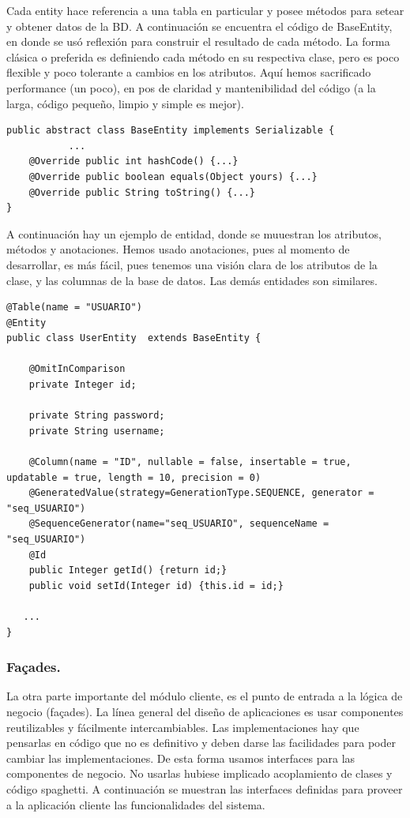 \documentclass[letter]{article}
\begin{document}
Cada entity hace referencia a una tabla en particular y posee métodos para setear y obtener datos de la BD. A continuación se encuentra el código de BaseEntity, en donde se usó reflexión para construir el resultado de cada método. La forma clásica o preferida es definiendo cada método en su respectiva clase, pero es poco flexible y poco tolerante a cambios en los atributos. Aquí hemos sacrificado performance (un poco), en pos de claridad y mantenibilidad del código (a la larga, código pequeño, limpio y simple es mejor).

\begin{lstlisting}
public abstract class BaseEntity implements Serializable {
           ...
	@Override public int hashCode() {...}
	@Override public boolean equals(Object yours) {...}
	@Override public String toString() {...}
}
\end{lstlisting}

A continuación hay un ejemplo de entidad, donde se muuestran los atributos, métodos y anotaciones. Hemos usado anotaciones, pues al momento de desarrollar, es más fácil, pues tenemos una visión clara de los atributos de la clase, y las columnas de la base de datos. Las demás entidades son similares.

\begin{lstlisting}
@Table(name = "USUARIO")
@Entity
public class UserEntity  extends BaseEntity {

    @OmitInComparison
    private Integer id;

    private String password;
    private String username;

    @Column(name = "ID", nullable = false, insertable = true, updatable = true, length = 10, precision = 0)
    @GeneratedValue(strategy=GenerationType.SEQUENCE, generator = "seq_USUARIO")
    @SequenceGenerator(name="seq_USUARIO", sequenceName = "seq_USUARIO")
    @Id
    public Integer getId() {return id;}
    public void setId(Integer id) {this.id = id;}

   ...
}
\end{lstlisting}

\subsubsection{Fa\c{c}ades.}

La otra parte importante del módulo cliente, es el punto de entrada a la lógica de negocio (fa\c{c}ades). La línea general del diseño de aplicaciones es usar componentes reutilizables y fácilmente intercambiables. Las implementaciones hay que pensarlas en código que no es definitivo y deben darse las facilidades para poder cambiar las implementaciones. De esta forma usamos interfaces para las componentes de negocio. No usarlas hubiese implicado acoplamiento de clases y código spaghetti. A continuación se muestran las interfaces definidas para proveer a la aplicación cliente las funcionalidades del sistema.
\end{document}

